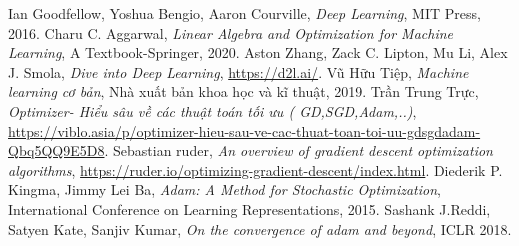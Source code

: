 \documentclass[11pt,oneside,a4paper]{report}
\theoremstyle{definition}
\begin{document}
\clearpage
\begin{thebibliography}{99}
	 Ian Goodfellow, Yoshua Bengio, Aaron Courville, \textit{Deep Learning}, MIT Press, 2016.
	 Charu C. Aggarwal, \textit{Linear Algebra and Optimization for Machine Learning}, A Textbook-Springer, 2020.
	 Aston Zhang, Zack C. Lipton, Mu Li, Alex J. Smola, \textit{Dive into Deep Learning}, \url{https://d2l.ai/}.
	 Vũ Hữu Tiệp, \textit{Machine learning cơ bản}, Nhà xuất bản khoa học và kĩ thuật, 2019.
	 Trần Trung Trực, \textit{Optimizer- Hiểu sâu về các thuật toán tối ưu ( GD,SGD,Adam,..)}, \url{https://viblo.asia/p/optimizer-hieu-sau-ve-cac-thuat-toan-toi-uu-gdsgdadam-Qbq5QQ9E5D8}.
	 Sebastian ruder, \textit{\textit{An overview of gradient descent optimization algorithms}}, \url{https://ruder.io/optimizing-gradient-descent/index.html}.
	 Diederik P. Kingma, Jimmy Lei Ba, \textit{Adam: A Method for Stochastic Optimization}, International Conference on Learning Representations, 2015.
	 Sashank J.Reddi, Satyen Kate, Sanjiv Kumar, \textit{On the convergence of adam and
	beyond}, ICLR 2018.


\end{thebibliography}
\end{document}
